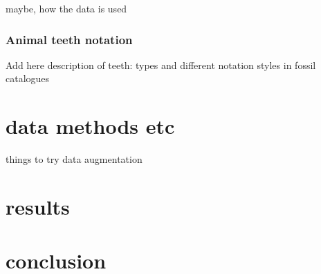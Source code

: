 \documentclass{article}
\begin{document}
maybe, how the data is used

\subsubsection{Animal teeth notation}

Add here description of teeth: types and different notation styles in fossil catalogues

\section{data methods etc}

things to try
data augmentation

\section{results}

\section{conclusion}

\printbibliography
\end{document}
